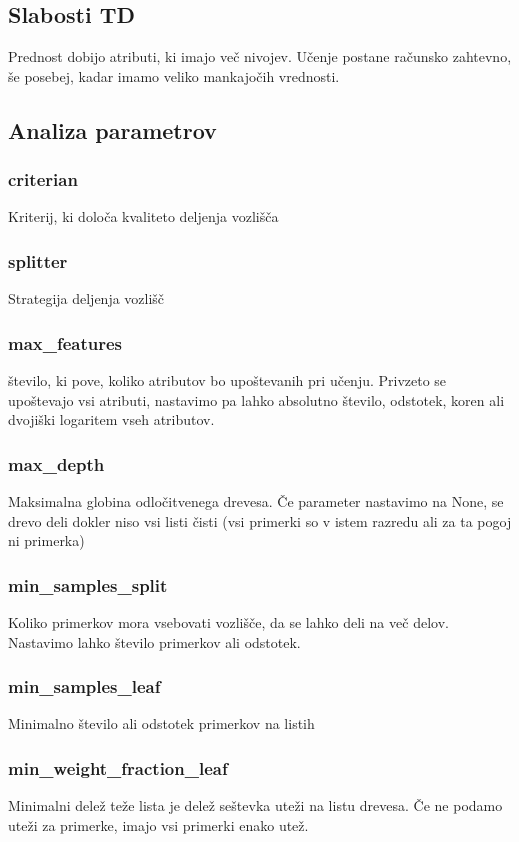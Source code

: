 \documentclass[a4paper,11pt]{article}
\begin{document}
\subsection{Slabosti TD}
	Prednost dobijo atributi, ki imajo več nivojev.
	Učenje postane računsko zahtevno, še posebej, kadar imamo veliko mankajočih vrednosti.
	
\subsection{Analiza parametrov}
\subsubsection{criterian}
Kriterij, ki določa kvaliteto deljenja vozlišča

\subsubsection{splitter}
Strategija deljenja vozlišč

\subsubsection{max_features}
število, ki pove, koliko atributov bo upoštevanih pri učenju. Privzeto se upoštevajo vsi atributi,  nastavimo pa lahko absolutno število, odstotek, koren ali dvojiški logaritem vseh atributov.

\subsubsection{max_depth}
Maksimalna globina odločitvenega drevesa. Če parameter nastavimo na None, se drevo deli dokler niso vsi listi čisti (vsi primerki so v istem razredu ali za ta pogoj ni primerka)

\subsubsection{min_samples_split}
Koliko primerkov mora vsebovati vozlišče, da se lahko deli na več delov. Nastavimo lahko število primerkov ali odstotek.

\subsubsection{min_samples_leaf}
Minimalno število ali odstotek primerkov na listih

\subsubsection{min_weight_fraction_leaf}
Minimalni delež teže lista je delež seštevka uteži na listu drevesa. Če ne podamo uteži za primerke, imajo vsi primerki enako utež.
\end{document}
